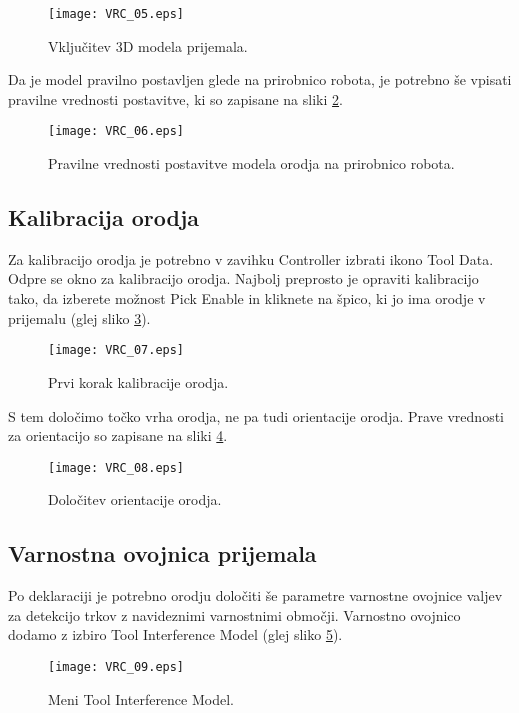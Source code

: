 \begin{figure}[hbt]
	\centering
	\texttt{[image: VRC\_05.eps]}
	\caption{Vključitev 3D modela prijemala.}
	\label{fig:VRC_05}
\end{figure}

Da je model pravilno postavljen glede na prirobnico robota, je potrebno še vpisati pravilne vrednosti postavitve, ki so zapisane na sliki \ref{fig:VRC_06}.

\begin{figure}[hbt]
	\centering
	\texttt{[image: VRC\_06.eps]}
	\caption{Pravilne vrednosti postavitve modela orodja na prirobnico robota.}
	\label{fig:VRC_06}
\end{figure}

\subsection*{Kalibracija orodja}

Za kalibracijo orodja je potrebno v zavihku Controller izbrati ikono Tool Data. Odpre se okno za kalibracijo orodja. Najbolj preprosto je opraviti kalibracijo tako, da izberete možnost Pick Enable in kliknete na špico, ki jo ima orodje v prijemalu (glej sliko \ref{fig:VRC_07}).

\begin{figure}[hbt]
	\centering
	\texttt{[image: VRC\_07.eps]}
	\caption{Prvi korak kalibracije orodja.}
	\label{fig:VRC_07}
\end{figure}

 S tem določimo točko vrha orodja, ne pa tudi orientacije orodja. Prave vrednosti za orientacijo so zapisane na sliki \ref{fig:VRC_08}.
 
\begin{figure}[hbt]
	\centering
	\texttt{[image: VRC\_08.eps]}
	\caption{Določitev orientacije orodja.}
	\label{fig:VRC_08}
\end{figure}

\subsection*{Varnostna ovojnica prijemala}

Po deklaraciji je potrebno orodju določiti še parametre varnostne ovojnice valjev za detekcijo trkov z navideznimi varnostnimi območji. Varnostno ovojnico dodamo z izbiro Tool Interference Model (glej sliko \ref{fig:VRC_09}).

\begin{figure}[hbt]
	\centering
	\texttt{[image: VRC\_09.eps]}
	\caption{Meni Tool Interference Model.}
	\label{fig:VRC_09}
\end{figure}

